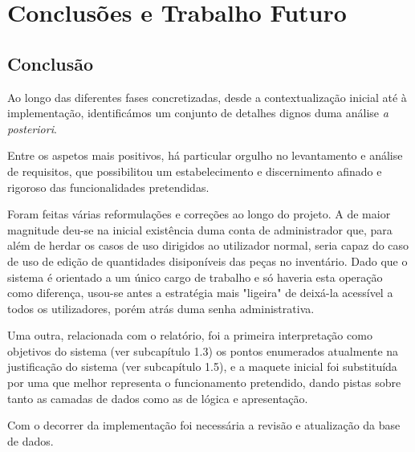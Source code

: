 
\chapter{Conclusões e Trabalho Futuro}

    \section{Conclusão}

        Ao longo das diferentes fases concretizadas, desde a contextualização inicial até à implementação, identificámos um conjunto de detalhes dignos duma análise \textit{a posteriori}.
         
        Entre os aspetos mais positivos, há particular orgulho no levantamento e análise de requisitos, que possibilitou um estabelecimento e discernimento afinado e rigoroso das funcionalidades pretendidas.
        
        Foram feitas várias reformulações e correções ao longo do projeto. A de maior magnitude deu-se na inicial existência duma conta de administrador que, para além de herdar os casos de uso dirigidos ao utilizador normal, seria capaz do caso de uso de edição de quantidades disiponíveis das peças no inventário. Dado que o sistema é orientado a um único cargo de trabalho e só haveria esta operação como diferença, usou-se antes a estratégia mais "ligeira" de deixá-la acessível a todos os utilizadores, porém atrás duma senha administrativa.
        
        Uma outra, relacionada com o relatório, foi a primeira interpretação como objetivos do sistema (ver subcapítulo 1.3) os pontos enumerados atualmente na justificação do sistema (ver subcapítulo 1.5), e a maquete inicial foi substituída por uma que melhor representa o funcionamento pretendido, dando pistas sobre tanto as camadas de dados como as de lógica e apresentação.

        Com o decorrer da implementação foi necessária a revisão e atualização da base de dados.

